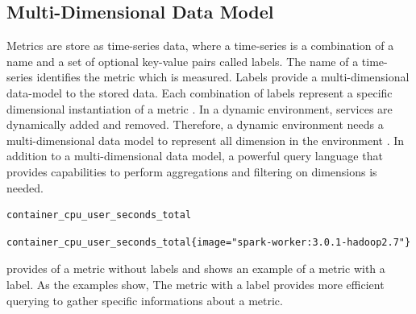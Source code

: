 \subsection{Multi-Dimensional Data Model}
\label{subsec:02_monitoring_db_multi-model}
Metrics are store as time-series data, where a time-series is a combination of a name and a set of optional key-value pairs called labels.
The name of a time-series identifies the metric which is measured.
Labels provide a multi-dimensional data-model to the stored data. Each combination of labels represent a specific dimensional instantiation of a metric \cite{Prom2020Docs}.
In a dynamic environment, services are dynamically added and removed. Therefore, a dynamic environment needs a multi-dimensional data model to represent all dimension in the environment \cite{Farcic2018Toolkit22}.
In addition to a multi-dimensional data model, a powerful query language that provides capabilities to perform aggregations and filtering on dimensions is needed.
\begin{lstlisting}[frame=single, label=lst:02_monitoring_db_multi-model_metr_dimless, caption=Example of a dimensionless-metric, captionpos=b]
container_cpu_user_seconds_total
\end{lstlisting}
\begin{lstlisting}[frame=single, label=lst:02_monitoring_db_multi-model_metr_withdim, caption=Example of a metric with dimensions, captionpos=b]
container_cpu_user_seconds_total{image="spark-worker:3.0.1-hadoop2.7"}
\end{lstlisting}
 provides of a metric without labels and  shows an example of a metric with a label. As the examples show, The metric with a label provides more efficient querying to gather specific informations about a metric.
